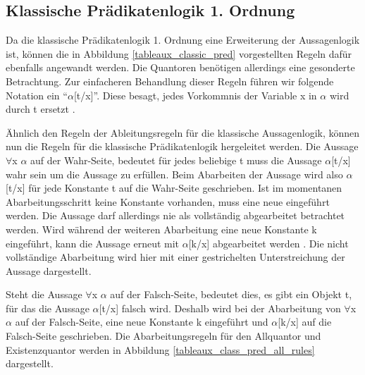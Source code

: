 \subsection{\label{tableaux_classic_pred}Klassische Prädikatenlogik 1. Ordnung}
Da die klassische Prädikatenlogik 1. Ordnung eine Erweiterung der Aussagenlogik ist, können die in Abbildung \ref{tableaux_classic_pred} vorgestellten Regeln dafür ebenfalls angewandt werden. Die Quantoren benötigen allerdings eine gesonderte Betrachtung. Zur einfacheren Behandlung dieser Regeln führen wir folgende Notation ein ``$\alpha$[t/x]''. Diese besagt, jedes Vorkommnis der Variable x in $\alpha$ wird durch t ersetzt \cite{DGHP99}.

Ähnlich den Regeln der Ableitungsregeln für die klassische Aussagenlogik, können nun die Regeln für die klassische Prädikatenlogik hergeleitet werden. Die Aussage $\forall$x $\alpha$ auf der Wahr-Seite, bedeutet für jedes beliebige t muss die Aussage $\alpha$[t/x] wahr sein um die Aussage zu erfüllen. Beim Abarbeiten der Aussage wird also $\alpha$[t/x] für jede Konstante t auf die Wahr-Seite geschrieben. Ist im momentanen Abarbeitungsschritt keine Konstante vorhanden, muss eine neue eingeführt werden. Die Aussage darf allerdings nie als vollständig abgearbeitet betrachtet werden. Wird während der weiteren Abarbeitung eine neue Konstante k eingeführt, kann die Aussage erneut mit $\alpha$[k/x] abgearbeitet werden \cite{KB14}. Die nicht vollständige Abarbeitung wird hier mit einer gestrichelten Unterstreichung der Aussage dargestellt.

Steht die Aussage $\forall$x $\alpha$ auf der Falsch-Seite, bedeutet dies, es gibt ein Objekt t, für das die Aussage $\alpha$[t/x] falsch wird. Deshalb wird bei der Abarbeitung von $\forall$x $\alpha$ auf der Falsch-Seite, eine neue Konstante k eingeführt und $\alpha$[k/x] auf die Falsch-Seite geschrieben. Die Abarbeitungsregeln für den Allquantor und Existenzquantor werden in Abbildung \ref{tableaux_class_pred_all_rules} dargestellt.

